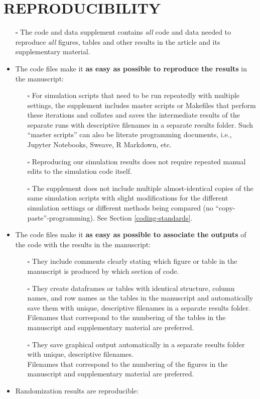 \documentclass[
  paper=a4,
  ,captions=tableheading
]{scrartcl}
\begin{document}
\section{REPRODUCIBILITY}\label{reproducibility}

\begin{itemize}
\item[$\square$]
  The code and data supplement contains \emph{all} code and data needed to reproduce \emph{all} figures, tables and other results in the article and its supplementary material.
\item
  The code files make it \textbf{as easy as possible to reproduce the results} in the manuscript:

  \begin{itemize}
  \item[$\square$]
    For simulation scripts that need to be run repeatedly with multiple settings, the supplement includes master scripts or Makefiles that perform these iterations and collates and saves the intermediate results of the separate runs with descriptive filenames in a separate results folder. Such ``master scripts'' can also be literate programming documents, i.e., Jupyter Notebooks, Sweave, R Markdown, etc.
  \item[$\square$]
    Reproducing our simulation results does not require repeated manual edits to the simulation code itself.
  \item[$\square$]
    The supplement does not include multiple almost-identical copies of the same simulation scripts with slight modifications for the different simulation settings or different methods being compared (no ``copy-paste''-programming). See Section \ref{coding-standards}.
  \end{itemize}
\item
  The code files make it \textbf{as easy as possible to associate the outputs} of the code with the results in the manuscript:

  \begin{itemize}
  \item[$\square$]
    They include comments clearly stating which figure or table in the manuscript is produced by which section of code.
  \item[$\square$]
    They create dataframes or tables with identical structure, column names, and row names as the tables in the manuscript and automatically save them with unique, descriptive filenames in a separate results folder.\\
    Filenames that correspond to the numbering of the tables in the manuscript and supplementary material are preferred.
  \item[$\square$]
    They save graphical output automatically in a separate results folder with unique, descriptive filenames.\\
    Filenames that correspond to the numbering of the figures in the manuscript and supplementary material are preferred.
  \end{itemize}
\item
  Randomization results are reproducible:


\end{itemize}
\end{document}
